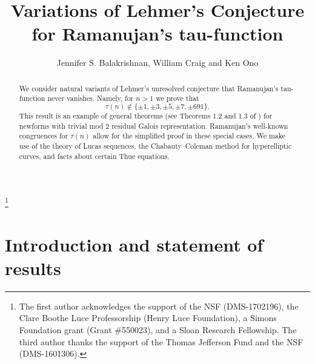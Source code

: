 \documentclass[12pt]{amsart}
\numberwithin{equation}{section}
\begin{document}
\title[Variations of Lehmer's Conjecture]{Variations of Lehmer's Conjecture for Ramanujan's tau-function}
\author{Jennifer S. Balakrishnan, William Craig and Ken Ono}
\address{Department of Mathematics and Statistics, Boston University,
Boston, MA 02215}
\address{Department of Mathematics, University of Virginia, Charlottesville, VA 22904}
\thanks{The first author acknowledges the support of the NSF (DMS-1702196), the Clare Boothe Luce Professorship
(Henry Luce Foundation), a Simons Foundation grant (Grant \#550023), and a Sloan
Research Fellowship. The third author thanks the support of the Thomas Jefferson Fund and the NSF
(DMS-1601306).}

\begin{abstract} 
We consider natural variants of Lehmer's unresolved conjecture that Ramanujan's tau-function never vanishes.
Namely, for $n>1$ we prove that
$$\tau(n)\not \in \{\pm 1, \pm 3, \pm 5, \pm 7, \pm 691\}.
$$
This result is an example of general theorems (see Theorems 1.2 and 1.3 of \cite{BCO}) for newforms with trivial mod 2 residual Galois representation. Ramanujan's well-known congruences for $\tau(n)$ allow for the simplified proof in these special cases.  We make use of the theory of Lucas sequences, the Chabauty--Coleman method for hyperelliptic curves, and facts
about certain Thue equations.
\end{abstract}
\maketitle
\section{Introduction and statement of results}
\end{document}
